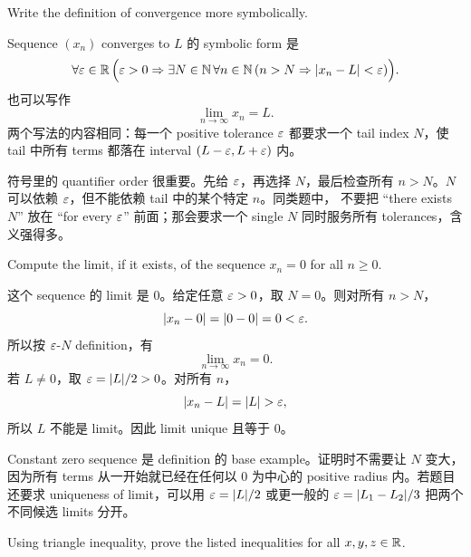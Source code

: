 \begin{exerciseblock}
Write the definition of convergence more symbolically.
\end{exerciseblock}

\begin{solution}
Sequence \((x_n)\) converges to \(L\) 的 symbolic form 是
\[
  \forall \varepsilon\in\mathbb{R}\,
  \Bigl(\varepsilon>0\Rightarrow
  \exists N\in\mathbb{N}\,
  \forall n\in\mathbb{N}\,
  (n>N\Rightarrow |x_n-L|<\varepsilon)\Bigr).
\]
也可以写作
\[
  \lim_{n\to\infty}x_n=L.
\]
两个写法的内容相同：每一个 positive tolerance \(\varepsilon\) 都要求一个 tail index
\(N\)，使 tail 中所有 terms 都落在 interval \((L-\varepsilon,L+\varepsilon)\) 内。
\end{solution}

\begin{explanation}
符号里的 quantifier order 很重要。先给 \(\varepsilon\)，再选择 \(N\)，最后检查所有
\(n>N\)。\(N\) 可以依赖 \(\varepsilon\)，但不能依赖 tail 中的某个特定 \(n\)。同类题中，
不要把 ``there exists \(N\)'' 放在 ``for every \(\varepsilon\)'' 前面；那会要求一个
single \(N\) 同时服务所有 tolerances，含义强得多。
\end{explanation}

\begin{exerciseblock}
Compute the limit, if it exists, of the sequence \(x_n=0\) for all \(n\geq0\).
\end{exerciseblock}

\begin{solution}
这个 sequence 的 limit 是 \(0\)。给定任意 \(\varepsilon>0\)，取 \(N=0\)。则对所有
\(n>N\)，
\[
  |x_n-0|=|0-0|=0<\varepsilon.
\]
所以按 \(\varepsilon\)-\(N\) definition，有
\[
  \lim_{n\to\infty}x_n=0.
\]
若 \(L\ne0\)，取 \(\varepsilon=|L|/2>0\)。对所有 \(n\)，
\[
  |x_n-L|=|L|>\eps,
\]
所以 \(L\) 不能是 limit。因此 limit unique 且等于 \(0\)。
\end{solution}

\begin{explanation}
Constant zero sequence 是 definition 的 base example。证明时不需要让 \(N\) 变大，
因为所有 terms 从一开始就已经在任何以 \(0\) 为中心的 positive radius 内。若题目
还要求 uniqueness of limit，可以用 \(\varepsilon=|L|/2\) 或更一般的
\(\varepsilon=|L_1-L_2|/3\) 把两个不同候选 limits 分开。
\end{explanation}

\begin{exerciseblock}
Using triangle inequality, prove the listed inequalities for all \(x,y,z\in\mathbb{R}\).
\end{exerciseblock}

